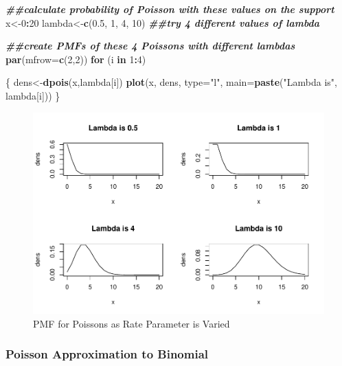 \documentclass[
]{book}
\newenvironment{Shaded}{\begin{snugshade}}{\end{snugshade}}
\newcommand{\AttributeTok}[1]{\textcolor[rgb]{0.13,0.29,0.53}{#1}}
\newcommand{\ControlFlowTok}[1]{\textcolor[rgb]{0.13,0.29,0.53}{\textbf{#1}}}
\newcommand{\DecValTok}[1]{\textcolor[rgb]{0.00,0.00,0.81}{#1}}
\newcommand{\DocumentationTok}[1]{\textcolor[rgb]{0.56,0.35,0.01}{\textbf{\textit{#1}}}}
\newcommand{\FloatTok}[1]{\textcolor[rgb]{0.00,0.00,0.81}{#1}}
\newcommand{\FunctionTok}[1]{\textcolor[rgb]{0.13,0.29,0.53}{\textbf{#1}}}
\newcommand{\NormalTok}[1]{#1}
\newcommand{\OtherTok}[1]{\textcolor[rgb]{0.56,0.35,0.01}{#1}}
\newcommand{\SpecialCharTok}[1]{\textcolor[rgb]{0.81,0.36,0.00}{\textbf{#1}}}
\newcommand{\StringTok}[1]{\textcolor[rgb]{0.31,0.60,0.02}{#1}}
\begin{document}
\begin{Shaded}
\begin{Highlighting}[]
\DocumentationTok{\#\#calculate probability of Poisson with these values on the support}
\NormalTok{x}\OtherTok{\textless{}{-}}\DecValTok{0}\SpecialCharTok{:}\DecValTok{20}
\NormalTok{lambda}\OtherTok{\textless{}{-}}\FunctionTok{c}\NormalTok{(}\FloatTok{0.5}\NormalTok{, }\DecValTok{1}\NormalTok{, }\DecValTok{4}\NormalTok{, }\DecValTok{10}\NormalTok{) }\DocumentationTok{\#\#try 4 different values of lambda}

\DocumentationTok{\#\#create PMFs of these 4 Poissons with different lambdas}
\FunctionTok{par}\NormalTok{(}\AttributeTok{mfrow=}\FunctionTok{c}\NormalTok{(}\DecValTok{2}\NormalTok{,}\DecValTok{2}\NormalTok{))}
\ControlFlowTok{for}\NormalTok{ (i }\ControlFlowTok{in} \DecValTok{1}\SpecialCharTok{:}\DecValTok{4}\NormalTok{)}
  
\NormalTok{\{}
\NormalTok{  dens}\OtherTok{\textless{}{-}}\FunctionTok{dpois}\NormalTok{(x,lambda[i])}
  \FunctionTok{plot}\NormalTok{(x, dens, }\AttributeTok{type=}\StringTok{"l"}\NormalTok{, }\AttributeTok{main=}\FunctionTok{paste}\NormalTok{(}\StringTok{"Lambda is"}\NormalTok{, lambda[i]))}
\NormalTok{\}}
\end{Highlighting}
\end{Shaded}

\begin{figure}
\centering
\includegraphics{bookdown-demo_files/figure-latex/3-pmfs-lambda-1.pdf}
\caption{\label{fig:3-pmfs-lambda}PMF for Poissons as Rate Parameter is Varied}
\end{figure}

\hypertarget{poisson-approximation-to-binomial}{%
\subsubsection{Poisson Approximation to Binomial}\label{poisson-approximation-to-binomial}}
\end{document}
